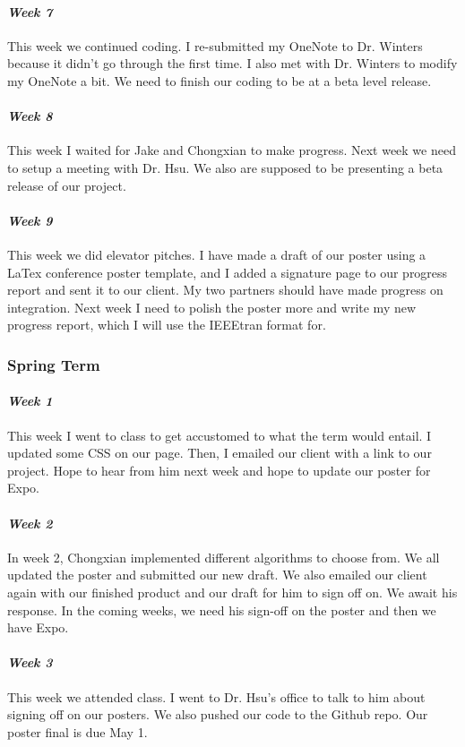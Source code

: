 \documentclass[onecolumn, draftclsnofoot,10pt, compsoc]{IEEEtran}
\begin{document}
\paragraph{\emph{Week 7}}
This week we continued coding. I re-submitted my OneNote to Dr. Winters because it didn't go through the first time. I also met with Dr. Winters to modify my OneNote a bit. We need to finish our coding to be at a beta level release.
\paragraph{\emph{Week 8}}
This week I waited for Jake and Chongxian to make progress. Next week we need to setup a meeting with Dr. Hsu. We also are supposed to be presenting a beta release of our project.
\paragraph{\emph{Week 9}}
This week we did elevator pitches. I have made a draft of our poster using a LaTex conference poster template, and I added a signature page to our progress report and sent it to our client. My two partners should have made progress on integration. Next week I need to polish the poster more and write my new progress report, which I will use the IEEEtran format for.
\subsubsection{Spring Term}
\paragraph{\emph{Week 1}}
This week I went to class to get accustomed to what the term would entail. I updated some CSS on our page. Then, I emailed our client with a link to our project. Hope to hear from him next week and hope to update our poster for Expo.
\paragraph{\emph{Week 2}}
In week 2, Chongxian implemented different algorithms to choose from. We all updated the poster and submitted our new draft. We also emailed our client again with our finished product and our draft for him to sign off on. We await his response. In the coming weeks, we need his sign-off on the poster and then we have Expo.
\paragraph{\emph{Week 3}}
This week we attended class. I went to Dr. Hsu's office to talk to him about signing off on our posters. We also pushed our code to the Github repo. Our poster final is due May 1.
\end{document}
